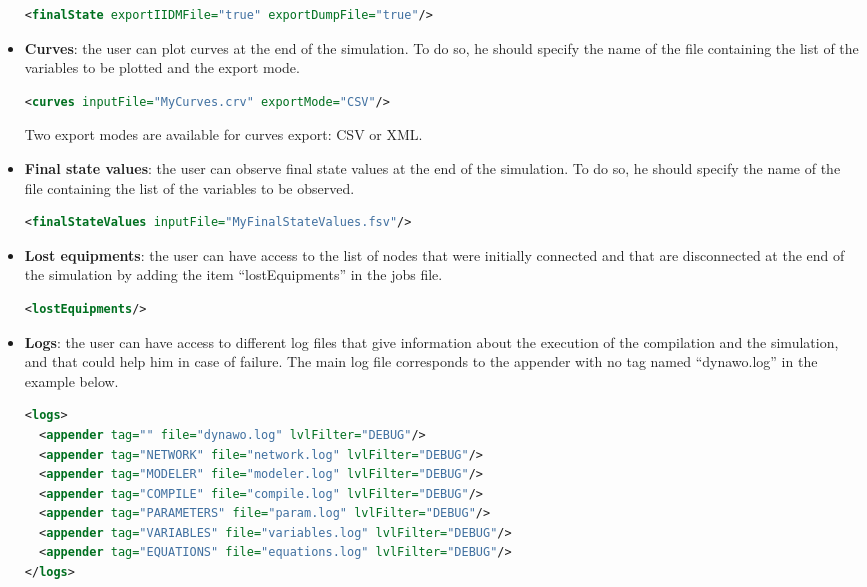 \documentclass[a4paper, 12pt]{report}
\begin{document}
\begin{itemize}
\begin{lstlisting}[language=XML, morekeywords={finalState},numbers=none]
<finalState exportIIDMFile="true" exportDumpFile="true"/>
\end{lstlisting}

\item \textbf{Curves}: the user can plot curves at the end of the simulation. To do so, he should specify the name of the file containing the list of the variables to be plotted and the export mode.

\begin{lstlisting}[language=XML, morekeywords={curves},numbers=none]
<curves inputFile="MyCurves.crv" exportMode="CSV"/>
\end{lstlisting}
Two export modes are available for curves export: CSV or XML.

\item \textbf{Final state values}: the user can observe final state values at the end of the simulation. To do so, he should specify the name of the file containing the list of the variables to be observed.

\begin{lstlisting}[language=XML, morekeywords={finalStateValues},numbers=none]
<finalStateValues inputFile="MyFinalStateValues.fsv"/>
\end{lstlisting}

\item \textbf{Lost equipments}:  the user can have access to the list of nodes that were initially connected and that are disconnected at the end of the simulation by adding the item ``lostEquipments'' in the jobs file.

\begin{lstlisting}[language=XML, morekeywords={lostEquipments},numbers=none]
<lostEquipments/>
\end{lstlisting}

\item \textbf{Logs}: the user can have access to different log files that give information about the execution of the compilation and the simulation, and that could help him in case of failure. The main log file corresponds to the appender with no tag named ``dynawo.log'' in the example below.
\begin{lstlisting}[language=XML, morekeywords={logs}]
<logs>
  <appender tag="" file="dynawo.log" lvlFilter="DEBUG"/>
  <appender tag="NETWORK" file="network.log" lvlFilter="DEBUG"/>
  <appender tag="MODELER" file="modeler.log" lvlFilter="DEBUG"/>
  <appender tag="COMPILE" file="compile.log" lvlFilter="DEBUG"/>
  <appender tag="PARAMETERS" file="param.log" lvlFilter="DEBUG"/>
  <appender tag="VARIABLES" file="variables.log" lvlFilter="DEBUG"/>
  <appender tag="EQUATIONS" file="equations.log" lvlFilter="DEBUG"/>
</logs>
\end{lstlisting}


\end{itemize}
\end{document}
